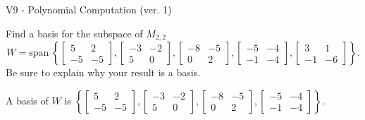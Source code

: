 \begin{exercise}
  \begin{exerciseTitle}V9 - Polynomial Computation (ver. 1)\end{exerciseTitle}
  \begin{exerciseStatement}
    Find a basis for the subspace of \(M_{2,2}\) 
\[W=\mathrm{span}\ \left\{\left[\begin{array}{cc}
5 & 2 \\
-5 & -5
\end{array}\right] , \left[\begin{array}{cc}
-3 & -2 \\
5 & 0
\end{array}\right] , \left[\begin{array}{cc}
-8 & -5 \\
0 & 2
\end{array}\right] , \left[\begin{array}{cc}
-5 & -4 \\
-1 & -4
\end{array}\right] , \left[\begin{array}{cc}
3 & 1 \\
-1 & -6
\end{array}\right]\right\}.\]
 Be sure to explain why your result is a basis.


  \end{exerciseStatement}
  \begin{exerciseAnswer}
   A basis of \(W\) is  \(\left\{\left[\begin{array}{cc}
5 & 2 \\
-5 & -5
\end{array}\right] , \left[\begin{array}{cc}
-3 & -2 \\
5 & 0
\end{array}\right] , \left[\begin{array}{cc}
-8 & -5 \\
0 & 2
\end{array}\right] , \left[\begin{array}{cc}
-5 & -4 \\
-1 & -4
\end{array}\right]\right\}\).
  


  \end{exerciseAnswer}
\end{exercise}